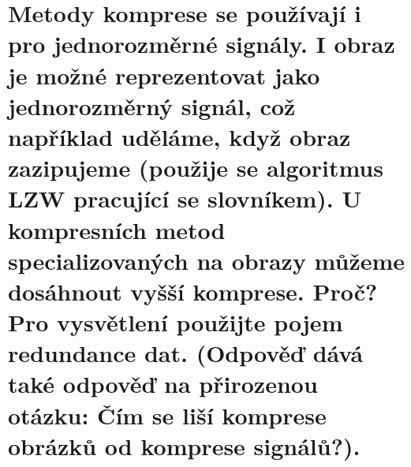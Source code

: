 \section{Metody komprese se používají i pro jednorozměrné signály. I obraz je možné reprezentovat jako jednorozměrný 
signál, což například uděláme, když obraz zazipujeme (použije se algoritmus LZW pracující se slovníkem). U kompresních 
metod specializovaných na obrazy můžeme dosáhnout vyšší komprese. Proč? Pro vysvětlení použijte pojem redundance dat. 
(Odpověď dává také odpověď na přirozenou otázku: Čím se liší komprese obrázků od komprese signálů?).}